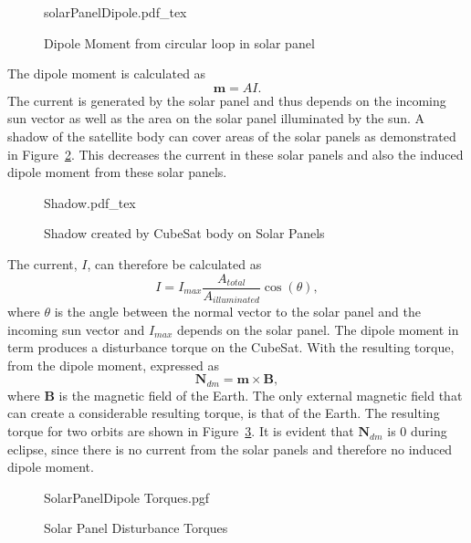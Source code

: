 \begin{figure}[!hbt]
	\centering
	\def\svgwidth{14cm}
	{solarPanelDipole.pdf_tex}
	\caption{Dipole Moment from circular loop in solar panel}
	\label{fig:solarPanelDipole}
\end{figure}

The dipole moment is calculated as
\begin{equation}
\mathbf{m} = AI.
\end{equation}
The current is generated by the solar panel and thus depends on the incoming sun vector as well as the area on the solar panel illuminated by the sun. A shadow of the satellite body can cover areas of the solar panels as demonstrated in Figure~\ref{fig:Shadow}. This decreases the current in these solar panels and also the induced dipole moment from these solar panels.

\begin{figure}[!hbt]
	\centering
	\def\svgwidth{14cm}
	{Shadow.pdf_tex}
	\caption{Shadow created by CubeSat body on Solar Panels}
	\label{fig:Shadow}
\end{figure}

The current, $I$, can therefore be calculated as
\begin{equation}
I = I_{max}\frac{A_{total}}{A_{illuminated}}\cos(\theta),
\end{equation}
where $\theta$ is the angle between the normal vector to the solar panel and the incoming sun vector and $I_{max}$ depends on the solar panel. The dipole moment in term produces a disturbance torque on the CubeSat. With the resulting torque, from the dipole moment, expressed as
\begin{equation}
\mathbf{N}_{dm} = \mathbf{m} \times \mathbf{B},
\end{equation}
where $\mathbf{B}$ is the magnetic field of the Earth. The only external magnetic field that can create a considerable resulting torque, is that of the Earth. The resulting torque for two orbits are shown in Figure~\ref{fig:solarPanel Disturbance Torques}. It is evident that $\mathbf{N}_{dm}$ is $0$ during eclipse, since there is no current from the solar panels and therefore no induced dipole moment. 

\begin{figure}[!htb]
	\centering
	
	{SolarPanelDipole Torques.pgf}
	
	\caption{Solar Panel Disturbance Torques}
	\label{fig:solarPanel Disturbance Torques}
\end{figure}


